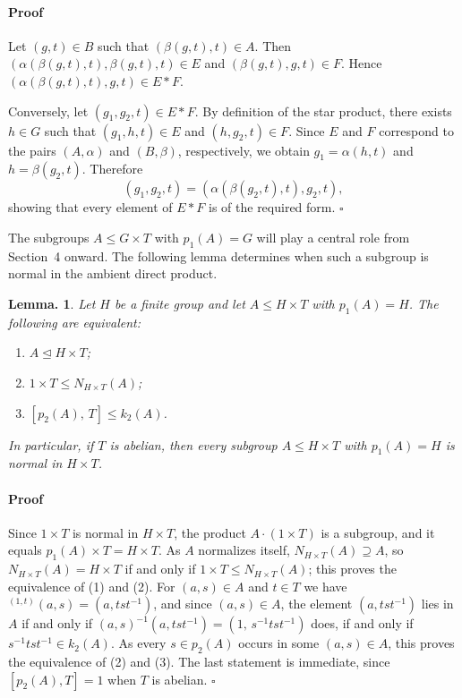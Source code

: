 \documentclass[12pt]{article}
\theoremstyle{change}
\newtheorem{lem}[theorem]{Lemma.}
\newenvironment{proof}{\paragraph{Proof}}{\hfill$\square$}
\renewcommand{\le}{\leqslant} %
\newcommand{\1}{{\bf 1}}
\begin{document}
\begin{proof}
Let \((g,t)\in B\) such that \((\beta(g,t),t)\in A\). Then
\((\alpha(\beta(g,t),t),\beta(g,t),t)\in E\)
and
\((\beta(g,t),g,t)\in F\).
Hence
\((\alpha(\beta(g,t),t),g,t)\in E*F\).

Conversely, let \((g_1,g_2,t)\in E*F\). By definition of the star product, there exists \(h\in G\) such that
\((g_1,h,t)\in E\)
and
\((h,g_2,t)\in F\).
Since \(E\) and \(F\) correspond to the pairs \((A,\alpha)\) and \((B,\beta)\), respectively, we obtain
\(g_1=\alpha(h,t)\)
and
\(h=\beta(g_2,t)\).
Therefore
\[
(g_1,g_2,t)
=
(\alpha(\beta(g_2,t),t),g_2,t),
\]
showing that every element of \(E*F\) is of the required form.
\end{proof}

The subgroups $A\le G\times T$ with $p_1(A)=G$ will play a central role from Section~4 onward. The following lemma determines when such a subgroup is normal in the ambient direct product.

\begin{lem}\label{lem: Anormal}
Let $H$ be a finite group and let $A\le H\times T$ with $p_1(A)=H$. The following are equivalent:
\begin{enumerate}[leftmargin=2em]
\item $A\unlhd H\times T$;
\item $1\times T\le N_{H\times T}(A)$;
\item $[p_2(A),\,T]\le k_2(A)$.
\end{enumerate}
In particular, if $T$ is abelian, then every subgroup $A\le H\times T$ with $p_1(A)=H$ is normal in $H\times T$.
\end{lem}
\begin{proof}
Since $1\times T$ is normal in $H\times T$, the product $A\cdot(1\times T)$ is a subgroup, and it equals $p_1(A)\times T=H\times T$. As $A$ normalizes itself, $N_{H\times T}(A)\supseteq A$, so $N_{H\times T}(A)=H\times T$ if and only if $1\times T\le N_{H\times T}(A)$; this proves the equivalence of (1) and (2). For $(a,s)\in A$ and $t\in T$ we have ${}^{(1,t)}(a,s)=(a,tst^{-1})$, and since $(a,s)\in A$, the element $(a,tst^{-1})$ lies in $A$ if and only if $(a,s)^{-1}(a,tst^{-1})=(1,\,s^{-1}tst^{-1})$ does, if and only if $s^{-1}tst^{-1}\in k_2(A)$. As every $s\in p_2(A)$ occurs in some $(a,s)\in A$, this proves the equivalence of (2) and (3). The last statement is immediate, since $[p_2(A),T]=1$ when $T$ is abelian.
\end{proof}
\end{document}

